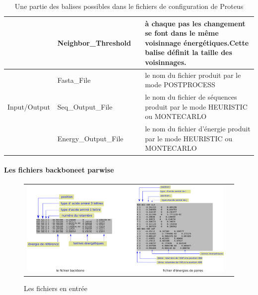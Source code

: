 \begin{table}[!htbp]
\begin{tabular}{|p{0.2\linewidth}|p{0.35\linewidth}|p{0.45\linewidth}|}
                         & Neighbor\_Threshold & à chaque pas les changement se font dans le même voisinnage énergétiques.Cette balise définit la taille des voisinnages.\\   \hline
        
                         & Fasta\_File & le nom du fichier produit par le mode POSTPROCESS\\    \cline{2-3}             
        Input/Output     & Seq\_Output\_File & le nom  du fichier de séquences produit par le mode HEURISTIC ou MONTECARLO\\    \cline{2-3}             
                         & Energy\_Output\_File & le nom du fichier d'énergie produit par le mode  HEURISTIC ou MONTECARLO\\   \hline              

      \end{tabular} 

      \caption{ Une partie des balises possibles dans le fichiers de configuration de Proteus}      

      \label{table1}

  \end{table}





\paragraph{Les fichiers \og backbone\fg et \og parwise\fg}


   \begin{figure}[t]
     \centering
     \begin{tabular}{cc}
       \includegraphics[width=12cm]{graphe/proteus/inputener.png} &
     \end{tabular}
     
     \caption{Les fichiers en entrée}
\label{graph:struct_Phy}
   \end{figure}



